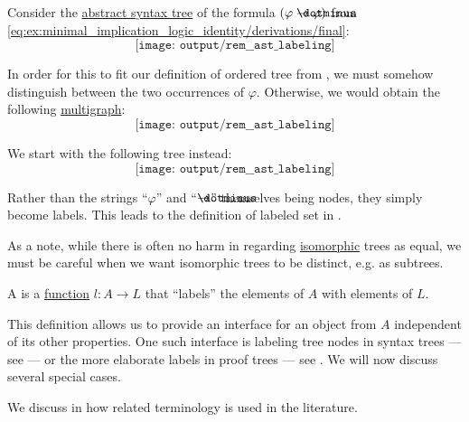 \begin{remark}\label{rem:ast_labeling}
  Consider the \hyperref[def:propositional_formula_ast]{abstract syntax tree} of the formula \( (\varphi \synimplies \varphi) \) from \eqref{eq:ex:minimal_implication_logic_identity/derivations/final}:
  \begin{equation*}
    \texttt{[image: output/rem\_\_ast\_labeling]}
  \end{equation*}

  In order for this to fit our definition of ordered tree from , we must somehow distinguish between the two occurrences of \( \varphi \). Otherwise, we would obtain the following \hyperref[def:undirected_multigraph]{multigraph}:
  \begin{equation*}
    \texttt{[image: output/rem\_\_ast\_labeling]}
  \end{equation*}

  We start with the following tree instead:
  \begin{equation*}
    \texttt{[image: output/rem\_\_ast\_labeling]}
  \end{equation*}

  Rather than the strings \enquote{\( \varphi \)} and \enquote{\( \synimplies \)} themselves being nodes, they simply become labels. This leads to the definition of labeled set in .

  As a note, while there is often no harm in regarding \hyperref[def:ordered_tree/homomorphism]{isomorphic} trees as equal, we must be careful when we want isomorphic trees to be distinct, e.g. as subtrees.
\end{remark}

\begin{definition}\label{def:labeled_set}\mimprovised
  A  is a \hyperref[def:function]{function} \( l: A \to L \) that \enquote{labels} the elements of \( A \) with elements of \( L \).
\end{definition}
\begin{comments}
  \item This definition allows us to provide an interface for an object from \( A \) independent of its other properties. One such interface is labeling tree nodes in syntax trees --- see  --- or the more elaborate labels in proof trees --- see . We will now discuss several special cases.

  \item We discuss in  how related terminology is used in the literature.
\end{comments}

